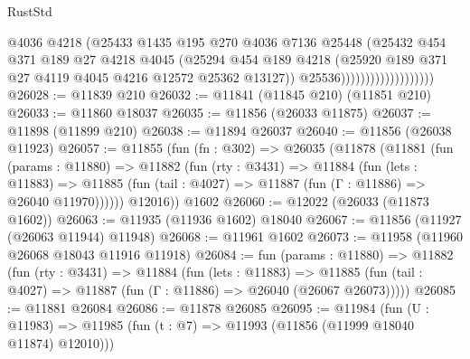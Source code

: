 \begin{lexlean}{RustStd}
\begin{coremodule}
                                      @4036
                                      @4218
                                      (@25433
                                        @1435
                                        @195
                                        @270
                                        @4036
                                        @7136
                                        @25448
                                        (@25432
                                          @454
                                          @371
                                          @189
                                          @27
                                          @4218
                                          @4045
                                          (@25294
                                            @454
                                            @189
                                            @4218
                                            (@25920
                                              @189
                                              @371
                                              @27
                                              @4119
                                              @4045
                                              @4216
                                              @12572
                                              @25362
                                              @13127))
                                          @25536)))))))))))))))))))
@26028 := @11839 @210
@26032 := @11841 (@11845 @210) (@11851 @210)
@26033 := @11860 @18037
@26035 := @11856 (@26033 @11875)
@26037 := @11898 (@11899 @210)
@26038 := @11894 @26037
@26040 := @11856 (@26038 @11923)
@26057 := @11855
    (fun (fn : @302) =>
    @26035
      (@11878
        (@11881
          (fun (params : @11880) =>
          @11882
            (fun (rty : @3431) =>
            @11884
              (fun (lets : @11883) =>
              @11885 (fun (tail : @4027) => @11887 (fun (Γ : @11886) => @26040 @11970))))))
        @12016))
    @1602
@26060 := @12022 (@26033 (@11873 @1602))
@26063 := @11935 (@11936 @1602) @18040
@26067 := @11856 (@11927 (@26063 @11944) @11948)
@26068 := @11961 @1602
@26073 := @11958 (@11960 @26068 @18043 @11916 @11918)
@26084 := fun (params : @11880) =>
  @11882
    (fun (rty : @3431) =>
    @11884
      (fun (lets : @11883) =>
      @11885 (fun (tail : @4027) => @11887 (fun (Γ : @11886) => @26040 (@26067 @26073)))))
@26085 := @11881 @26084
@26086 := @11878 @26085
@26095 := @11984
    (fun (U : @11983) => @11985 (fun (t : @7) => @11993 (@11856 (@11999 @18040 @11874) @12010)))

\end{coremodule}
\end{lexlean}
